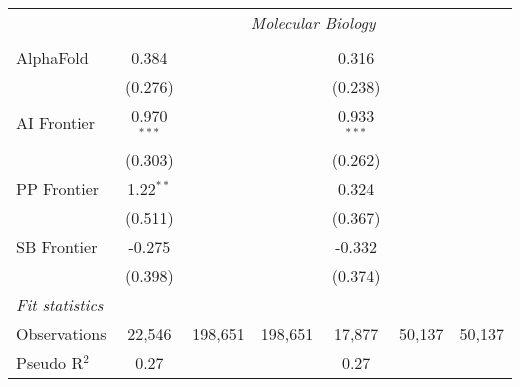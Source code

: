 \begin{tabular}{lcccccc}
 & \multicolumn{6}{c}{\textit{Molecular Biology}} \\ \\
   AlphaFold    & 0.384         &         &         & 0.316         &        &   \\   
                & (0.276)       &         &         & (0.238)       &        &   \\   
   AI Frontier  & 0.970$^{***}$ &         &         & 0.933$^{***}$ &        &   \\   
                & (0.303)       &         &         & (0.262)       &        &   \\   
   PP Frontier  & 1.22$^{**}$   &         &         & 0.324         &        &   \\   
                & (0.511)       &         &         & (0.367)       &        &   \\   
   SB Frontier  & -0.275        &         &         & -0.332        &        &   \\   
                & (0.398)       &         &         & (0.374)       &        &   \\   
   \midrule
   \emph{Fit statistics}\\
   Observations & 22,546        & 198,651 & 198,651 & 17,877        & 50,137 & 50,137\\  
   Pseudo R$^2$ & 0.27          &         &         & 0.27          &        & \\  
   

\end{tabular}
